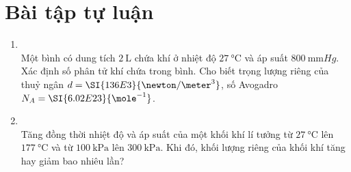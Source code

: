 \section{Bài tập tự luận}
\begin{enumerate}[label=\bfseries Câu \arabic*:, leftmargin=1.7cm]
	\item{}\\
	Một bình có dung tích $\SI{2}{\liter}$ chứa khí ở nhiệt độ $\SI{27}{\celsius}$ và áp suất $\SI{800}{\milli\meter Hg}$. Xác định số phân tử khí chứa trong bình. Cho biết trọng lượng riêng của thuỷ ngân $d=\SI{136E3}{\newton/\meter^3}$, số Avogadro $N_A=\SI{6.02E23}{\mole^{-1}}$.

\item {}\\
Tăng đồng thời nhiệt độ và áp suất của một khối khí lí tưởng từ $\SI{27}{\celsius}$ lên $\SI{177}{\celsius}$ và từ $\SI{100}{\kilo\pascal}$ lên $\SI{300}{\kilo\pascal}$. Khi đó, khối lượng riêng của khối khí tăng hay giảm bao nhiêu lần?


\end{enumerate}
